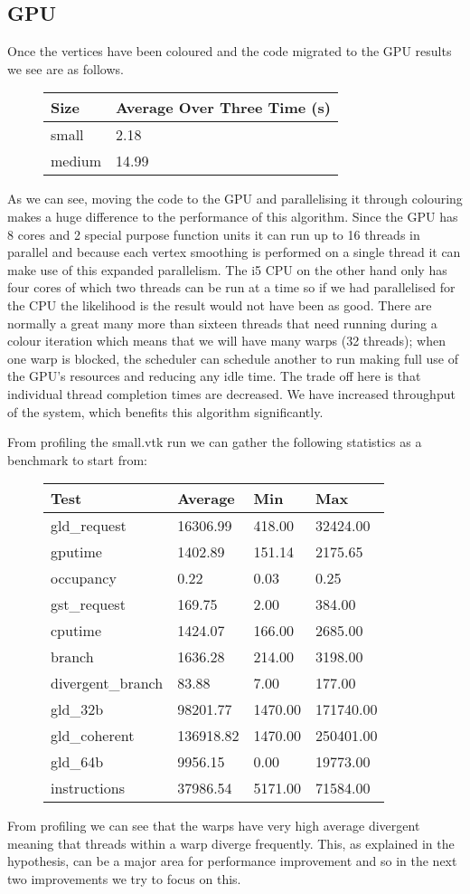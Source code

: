\subsection*{GPU}
Once the vertices have been coloured and the code migrated to the GPU results we see are as follows.\\
\begin{figure}[H]\centering \begin{tabular}{ l | l }
  \hline
  Size & Average Over Three Time (s) \\
  \hline
  \hline
  small & 2.18 \\
  medium & 14.99 \\
  \hline
\end{tabular} \end{figure}

As we can see, moving the code to the GPU and parallelising it through colouring makes a huge difference to the performance of this algorithm. Since the GPU has 8 cores and 2 special purpose function units it can run up to 16 threads in parallel and because each vertex smoothing is performed on a single thread it can make use of this expanded parallelism. The i5 CPU on the other hand only has four cores of which two threads can be run at a time so if we had parallelised for the CPU the likelihood is the result would not have been as good. There are normally a great many more than sixteen threads that need running during a colour iteration which means that we will have many warps (32 threads); when one warp is blocked, the scheduler can schedule another to run making full use of the GPU's resources and reducing any idle time.
The trade off here is that individual thread completion times are decreased. We have increased throughput of the system, which benefits this algorithm significantly.

From profiling the small.vtk run we can gather the following statistics as a benchmark to start from:\\
\begin{figure}[H]\centering \begin{tabular}{ l | l | l | l}
\hline
Test & Average & Min & Max \\
\hline
\hline
gld\_request & 16306.99 & 418.00 & 32424.00 \\
gputime & 1402.89 & 151.14 & 2175.65 \\
occupancy & 0.22 & 0.03 & 0.25 \\
gst\_request & 169.75 & 2.00 & 384.00 \\
cputime & 1424.07 & 166.00 & 2685.00 \\
branch & 1636.28 & 214.00 & 3198.00 \\
divergent\_branch & 83.88 & 7.00 & 177.00 \\
gld\_32b & 98201.77 & 1470.00 & 171740.00 \\
gld\_coherent & 136918.82 & 1470.00 & 250401.00 \\
gld\_64b & 9956.15 & 0.00 & 19773.00 \\
instructions & 37986.54 & 5171.00 & 71584.00 \\
\hline
\end{tabular} \end{figure}

From profiling we can see that the warps have very high average divergent meaning that threads within a warp diverge frequently. This, as explained in the hypothesis, can be a major area for performance improvement and so in the next two improvements we try to focus on this.

